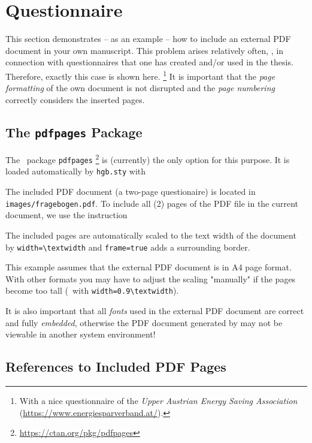 \chapter{Questionnaire}
\label{app:Questionnaire}

This section demonstrates -- as an example -- how to include an external PDF
document in your own \latex manuscript. This problem arises relatively often, 
\eg, in connection with questionnaires that one has created and/or used in
the thesis. Therefore, exactly this case is shown here.%
\footnote{With a nice questionnaire of the \emph{Upper Austrian Energy Saving
Association} (\url{https://www.energiesparverband.at/}).} 
It is important that the \emph{page formatting} of the own document is not
disrupted and the \emph{page numbering} correctly considers the inserted
pages.


\section{The \texttt{pdfpages} Package}

The \latex\ package \texttt{pdfpages}%
\footnote{\url{https://ctan.org/pkg/pdfpages}}
is (currently) the only option for this purpose. It is loaded automatically
by \nolinkurl{hgb.sty} with
%
\begin{LaTeXCode}[numbers=none]
\RequirePackage{pdfpages}
\end{LaTeXCode}
%
The included PDF document (a two-page questionaire) is located in
\nolinkurl{images/fragebogen.pdf}. To include all (2) pages of the PDF file
in the current document, we use the instruction
%
\begin{LaTeXCode}[numbers=none]

\end{LaTeXCode}
%
The included pages are automatically scaled to the text width of the \latex document
by \verb!width=\textwidth! and \verb!frame=true! adds a surrounding border.

This example assumes that the external PDF document is in A4 page format.
With other formats you may have to adjust the scaling "manually" if the pages become
too tall (\eg\ with \verb!width=0.9\textwidth!).

It is also important that all \emph{fonts} used in the external PDF document are
correct and fully \emph{embedded}, otherwise the PDF document generated by \latex may
not be viewable in another system environment!


\section{References to Included PDF Pages}


